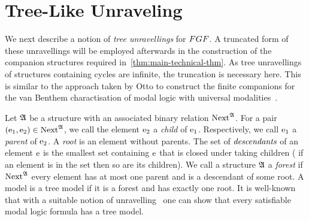
\section{Tree-Like Unraveling}\label{sec:unraveling}
We next describe a notion of \emph{tree unravellings} for $\FGF$.
A truncated form of these unravellings will be employed afterwards in the construction of the companion structures required in~\cref{thm:main-technical-thm}.
As tree unravellings of structures containing cycles are infinite, the truncation is necessary here.
This is similar to the approach taken by Otto to construct the finite companions for the van Benthem charactisation of modal logic with universal modalities~\cite[Proof of Lemma 38]{Otto04}.

Let ${\mathfrak{A}}$ be a structure with an associated binary relation $\mathrm{Next}^{{\mathfrak{A}}}$.
For a pair $(\mathrm{e}_1, \mathrm{e}_2) \in \mathrm{Next}^{{\mathfrak{A}}}$, we call the element $\mathrm{e}_2$ a \emph{child} of $\mathrm{e}_1$. Respectively, we call $\mathrm{e}_1$ a \emph{parent} of $\mathrm{e}_2$.
A \emph{root} is an element without parents.
The set of $\emph{descendants}$ of an element $\mathrm{e}$ is the smallest set containing $\mathrm{e}$ that is closed under taking children (\ie{} if an element is in the set then so are its children).
We call a structure ${\mathfrak{A}}$ a \emph{forest} if $\mathrm{Next}^{{\mathfrak{A}}}$ every element has at most one parent and is a descendant of some root.
A model is a tree model if it is a forest and has exactly one root.
It is well-known that with a suitable notion of unravelling~\cite[Prop. 3]{Rosen97} one can show that every satisfiable modal logic formula has a tree model.

